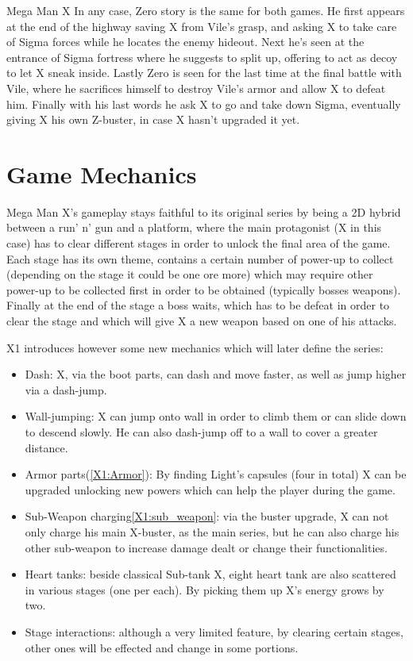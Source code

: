 \documentclass[openany]{report}
\begin{document}
\begin{chapter}{Mega Man X}
	In any case, Zero story is the same for both games. He first appears at the end of the highway saving X from Vile's grasp, and asking X to take care of Sigma forces while he locates the enemy hideout. Next he's seen at the entrance of Sigma fortress where he suggests to split up, offering to act as decoy to let X sneak inside. Lastly Zero is seen for the last time at the final battle with Vile, where he sacrifices himself to destroy Vile's armor and allow X to defeat him. Finally with his last words he ask X to go and take down Sigma, eventually giving X his own Z-buster, in case X hasn't upgraded it yet.
	\section{Game Mechanics}
	Mega Man X's gameplay stays faithful to its original series by being a 2D hybrid between a run' n' gun and a platform, where the main protagonist (X in this case) has to clear different stages in order to unlock the final area of the game. Each stage has its own theme, contains a certain number of power-up to collect (depending on the stage it could be one ore more) which may require other power-up to be collected first in order to be obtained (typically bosses weapons). Finally at the end of the stage a boss waits, which has to be defeat in order to clear the stage and which will give X a new weapon based on one of his attacks.

	X1 introduces however some new mechanics which will later define the series\cite{wiki:X1_features}:
	\begin{itemize}
		\item Dash: X, via the boot parts, can dash and move faster, as well as jump higher via a dash-jump.
		\item Wall-jumping: X can jump onto wall in order to climb them or can slide down to descend slowly. He can also dash-jump off to a wall to cover a greater distance.
		\item Armor parts(\ref{X1:Armor}): By finding Light's capsules (four in total) X can be upgraded unlocking new powers which can help the player during the game.
		\item Sub-Weapon charging\ref{X1:sub_weapon}: via the buster upgrade, X can not only charge his main X-buster, as the main series, but he can also charge his other sub-weapon to increase damage dealt or change their functionalities.
		\item Heart tanks: beside classical Sub-tank X, eight heart tank are also scattered in various stages (one per each). By picking them up X's energy grows by two.
		\item Stage interactions: although a very limited feature, by clearing certain stages, other ones will be effected and change in some portions.
	\end{itemize}

\end{chapter}
\end{document}
